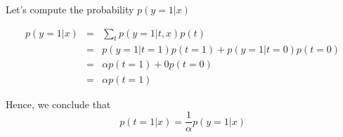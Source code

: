\begin{answer}
  Let's compute the probability $p(y=1|x)$

  \begin{eqnarray}
    p(y=1|x)& =& \sum_t  p(y=1|t,x) p(t)\\
            & =& p(y=1|t=1)p(t=1) + p(y=1|t=0)p(t=0)\\
            & =&  \alpha p(t=1) + 0 p(t=0)\\
            & = & \alpha p(t=1)
  \end{eqnarray}

  Hence, we conclude that 
  \begin{equation}
    p(t=1|x) = \dfrac{1}{\alpha} p(y=1|x)
  \end{equation}
\end{answer}
